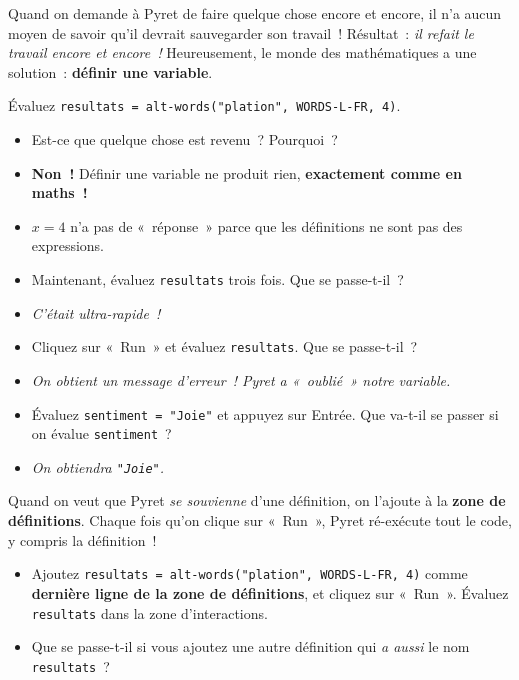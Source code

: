 \documentclass[12pt,a4paper]{article}
\begin{document}
Quand on demande à Pyret de faire quelque chose encore et encore, il n'a aucun moyen de savoir qu'il devrait sauvegarder son travail~! Résultat~: \emph{il refait le travail encore et encore~!} Heureusement, le monde des mathématiques a une solution~: \textbf{définir une variable}.

\begin{codebox}
  Évaluez \texttt{resultats = alt-words("plation", WORDS-L-FR, 4)}.

  \begin{itemize}
    \item Est-ce que quelque chose est revenu~? Pourquoi~?
    \item \textbf{Non~!} Définir une variable ne produit rien, \textbf{exactement comme en maths~!}
    \item $x = 4$ n'a pas de «~réponse~» parce que les définitions ne sont pas des expressions.
    \item Maintenant, évaluez \texttt{resultats} trois fois. Que se passe-t-il~?
    \item \emph{C'était ultra-rapide~!}
    \item Cliquez sur «~Run~» et évaluez \texttt{resultats}. Que se passe-t-il~?
    \item \emph{On obtient un message d'erreur~! Pyret a «~oublié~» notre variable.}
    \item Évaluez \texttt{sentiment = "Joie"} et appuyez sur Entrée. Que va-t-il se passer si on évalue \texttt{sentiment}~?
    \item \emph{On obtiendra \texttt{"Joie"}.}
  \end{itemize}
\end{codebox}

Quand on veut que Pyret \emph{se souvienne} d'une définition, on l'ajoute à la \textbf{zone de définitions}. Chaque fois qu'on clique sur «~Run~», Pyret ré-exécute tout le code, y compris la définition~!

\begin{activitybox}
  \begin{itemize}
    \item Ajoutez \texttt{resultats = alt-words("plation", WORDS-L-FR, 4)} comme \textbf{dernière ligne de la zone de définitions}, et cliquez sur «~Run~». Évaluez \texttt{resultats} dans la zone d'interactions.
    \item Que se passe-t-il si vous ajoutez une autre définition qui \emph{a aussi} le nom \texttt{resultats}~?
  \end{itemize}
\end{activitybox}
\end{document}
